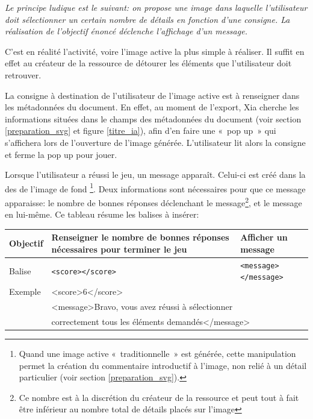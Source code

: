 {\textit{Le principe ludique est le suivant: on propose une image dans laquelle l'utilisateur 
doit sélectionner un certain nombre de détails en fonction d'une consigne. 
La réalisation de l'objectif énoncé déclenche l'affichage d'un message.}

C'est en réalité l'activité, voire l'image active la plus simple à réaliser. Il suffit en effet 
au créateur de la ressource de détourer les éléments que l'utilisateur doit retrouver.

La consigne à destination de l'utilisateur de l'image active est à renseigner 
dans les métadonnées du document. En effet, au moment de l'export, Xia cherche les informations
situées dans le champs  des métadonnées du document 
(voir section \ref{preparation_svg} et figure \ref{titre_ia}), afin d'en faire une «~pop up~»
qui s'affichera lors de l'ouverture de l'image générée. L'utilisateur lit alors la consigne et ferme
la pop up pour jouer.

Lorsque l'utilisateur a réussi le jeu, un message apparaît. 
Celui-ci est créé dans la  des  de l'image de fond
\footnote{Quand une image active «~traditionnelle~» est générée, cette manipulation
permet la création du commentaire introductif à l'image, non relié à un détail particulier
(voir section \ref{preparation_svg}).}. 
Deux informations sont nécessaires pour que ce message apparaisse:
le nombre de bonnes réponses déclenchant le message\footnote{Ce nombre est à la discrétion
du créateur de la ressource et peut tout à fait être inférieur au nombre total de détails placés sur l'image},
et le message en lui-même. Ce tableau résume les balises à insérer:

\begin{center}
 \begin{tabular}{|l|p{2in}|p{2in}|}
 \hline
  Objectif & Renseigner le nombre de bonnes réponses nécessaires pour terminer le jeu & Afficher un message\\
  \hline
  Balise & \verb|<score></score>| & \verb|<message></message>|\\
  \hline
  Exemple & \multicolumn{2}{|l|}{<score>6</score>}\\
   & \multicolumn{2}{|l|}{<message>Bravo, vous avez réussi à sélectionner}\\
    & \multicolumn{2}{|l|}{correctement tous les éléments demandés</message>}\\
  \hline
 \end{tabular}
\end{center}

}
